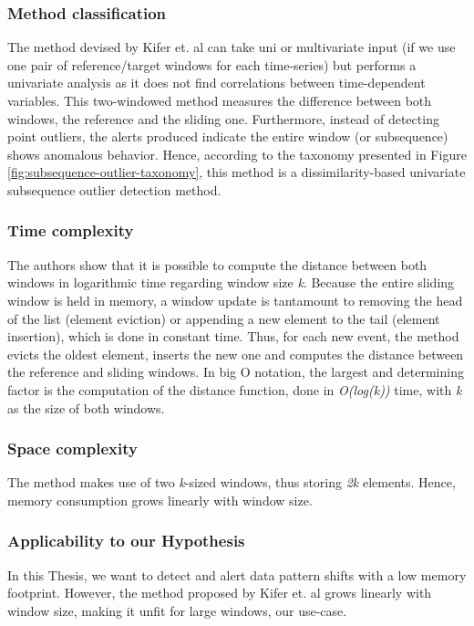 \subsubsection*{Method classification}
The method devised by Kifer et. al can take uni or multivariate input (if we use one pair of reference/target windows for each time-series) but performs a univariate analysis as it does not find correlations between time-dependent variables. This two-windowed method measures the difference between both windows, the reference and the sliding one. Furthermore, instead of detecting point outliers, the alerts produced indicate the entire window (or subsequence) shows anomalous behavior. Hence, according to the taxonomy presented in Figure \ref{fig:subsequence-outlier-taxonomy}, this method is a dissimilarity-based univariate subsequence outlier detection method.

\subsubsection*{Time complexity}
The authors show that it is possible to compute the distance between both windows in logarithmic time regarding window size \textit{k}. Because the entire sliding window is held in memory, a window update is tantamount to removing the head of the list (element eviction) or appending a new element to the tail (element insertion), which is done in constant time. Thus, for each new event, the method evicts the oldest element, inserts the new one and computes the distance between the reference and sliding windows. In big O notation, the largest and determining factor is the computation of the distance function, done in \textit{O(log(k))} time, with \textit{k} as the size of both windows.

\subsubsection*{Space complexity}
The method makes use of two \textit{k}-sized windows, thus storing \textit{2k} elements. Hence, memory consumption grows linearly with window size.

\subsubsection*{Applicability to our Hypothesis}
In this Thesis, we want to detect and alert data pattern shifts with a low memory footprint. However, the method proposed by Kifer et. al grows linearly with window size, making it unfit for large windows, our use-case.



